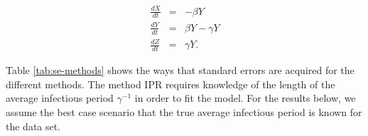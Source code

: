 \documentclass[12pt]{article}
\newcommand{\rr}{\ensuremath{\mathcal{R}_0}}
\begin{document}
\begin{eqnarray*}
	\frac{dX}{dt} &=& -\beta Y \\
	\frac{dY}{dt} &=& \beta Y - \gamma Y \\
	\frac{dZ}{dt} &=& \gamma Y.
\end{eqnarray*}


	
	
	
	
	
	
	
	
	



Table \ref{tab:se-methods} shows the ways that standard errors are acquired for the different methods. The method IPR requires knowledge of the length of the average infectious period $\gamma^{-1}$ in order to fit the model. For the results below, we assume the best case scenario that the true average infectious period is known for the data set. 
\end{document}
